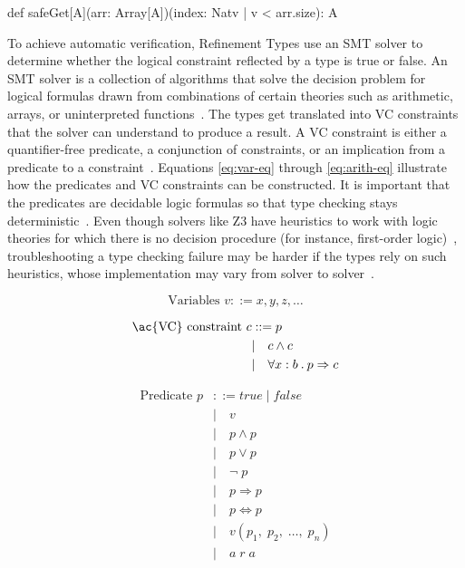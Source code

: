\begin{scala}[numbers=none,label=lst:safe-array-access, caption=Safe array access]
  def safeGet[A](arr: Array[A])(index: Nat{v | v < arr.size}): A
\end{scala}

To achieve automatic verification, Refinement Types use an \ac{SMT} solver to determine whether the 
logical constraint reflected by a type is true or false. An \ac{SMT} solver is a collection of algorithms 
that solve the decision problem for logical formulas drawn from combinations of certain theories such 
as arithmetic, arrays, or uninterpreted functions~\cite{demoura08}.
The types get translated into \ac{VC} constraints that the solver can understand to produce a result.
A \ac{VC} constraint is either a quantifier-free predicate, a conjunction of constraints, or an implication 
from a predicate to a constraint~\cite{jhala21}. Equations \ref{eq:var-eq} through \ref{eq:arith-eq} 
illustrate how the predicates and \ac{VC} constraints can be constructed. It is important that the 
predicates are decidable logic formulas so that type checking stays deterministic~\cite{jhala21}.
Even though solvers like Z3 have heuristics to work with logic theories for which there is no decision 
procedure (for instance, first-order logic)~\cite{demoura08}, troubleshooting a type checking failure 
may be harder if the types rely on such heuristics, whose implementation may vary from solver to 
solver~\cite{jhala21}.

\begin{equation}
\label{eq:var-eq}
\text{Variables } v ::= x,y,z,\dots
\end{equation}

\begin{minipage}[t]{0.5\linewidth}
\begin{equation}
\begin{split}
\text{\ac{VC} constraint } c &::= p \\
  &| \quad c \wedge c \\
  &| \quad \forall x : b \: . \: p \Rightarrow c
\end{split}
\end{equation}
\end{minipage}
\hfill
\begin{minipage}[t]{0.5\linewidth}
\begin{equation}
\label{eq:pred-eq}
\begin{split}
\text{Predicate } p &::= true \; | \; false \\
  &| \quad v \\
  &| \quad p \wedge p \\
  &| \quad p \vee p \\
  &| \quad \neg \; p \\
  &| \quad p \Rightarrow p \\
  &| \quad p \Leftrightarrow p \\
  &| \quad v(p_1, \; p_2, \; \dots, \; p_n) \\
  &| \quad a \; r \; a \\
\end{split}
\end{equation}
\end{minipage}

